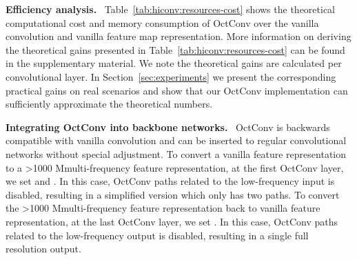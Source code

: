 \documentclass[10pt,twocolumn,letterpaper]{article}
\newcommand\hmm[1]{\ifnum\ifhmode\spacefactor\else2000\fi>1000 \uppercase{#1}\else#1\fi}
\newcommand{\hiConv}[0]{OctConv\xspace}
\newcommand{\hierarchicalfeaturerepresentation}[0]{\hmm{m}ulti-frequency feature representation\xspace}
\newcommand{\myparagraph}[1]{\vspace{1pt}\noindent\textbf{#1.}~}
\begin{document}
\begin{table}[t]
\centering
\renewcommand{\arraystretch}{1.2}
\vspace{-1pt}
\caption{Relative theoretical gains for the proposed \hierarchicalfeaturerepresentation over vanilla feature maps for varying choices of the ratio  of channels used by the low-frequency feature. When , no low-frequency feature is used which is the case of vanilla convolution. 
}
\label{tab:hiconv:resources-cost}
\end{table}


\myparagraph{Efficiency analysis}
Table~\ref{tab:hiconv:resources-cost} shows the theoretical computational cost and memory consumption of \hiConv over the vanilla convolution and vanilla feature map representation. More information on deriving the theoretical gains presented in Table~\ref{tab:hiconv:resources-cost} can be found in the supplementary material. We note the theoretical gains are calculated per convolutional layer. 
In Section~\ref{sec:experiments} we present the corresponding practical gains on real scenarios and show that our \hiConv implementation can sufficiently approximate the theoretical numbers.


\myparagraph{Integrating \hiConv into backbone networks}
\hiConv is backwards compatible with vanilla convolution and can be inserted to regular convolutional networks without special adjustment. To convert a vanilla feature representation to a \hierarchicalfeaturerepresentation, \ie at the first \hiConv layer, we set  and . In this case, \hiConv paths related to the low-frequency input is disabled, resulting in a simplified version which only has two paths. To convert the \hierarchicalfeaturerepresentation back to vanilla feature representation, \ie at the last \hiConv layer, we set . In this case, \hiConv paths related to the low-frequency output is disabled, resulting in a single full resolution output. 
\end{document}
